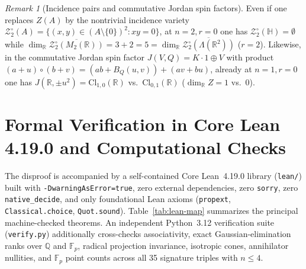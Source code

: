 \documentclass[11pt,a4paper]{article}
\theoremstyle{definition}
\theoremstyle{remark}
\newtheorem{remark}[theorem]{Remark}
\newcommand{\Cl}{\mathrm{Cl}}
\begin{document}
\begin{remark}[Incidence pairs and commutative Jordan spin factors]
Even if one replaces $Z(A)$ by the nontrivial incidence variety $\mathcal{Z}_2^\circ(A) = \{(x, y) \in (A \setminus \{0\})^2 : xy = 0\}$, at $n = 2, r = 0$ one has $\mathcal{Z}_2^\circ(\mathbb{H}) = \emptyset$ while $\dim_{\mathbb{R}} \overline{\mathcal{Z}_2^\circ(M_2(\mathbb{R}))} = 3 + 2 = 5 = \dim_{\mathbb{R}} \overline{\mathcal{Z}_2^\circ(\Lambda(\mathbb{R}^2))}$ ($r = 2$). Likewise, in the commutative Jordan spin factor $J(V, Q) = K\cdot 1 \oplus V$ with product $(a + u) \circ (b + v) = (ab + B_Q(u, v)) + (av + bu)$, already at $n = 1, r = 0$ one has $J(\mathbb{R}, \pm u^2) = \Cl_{1,0}(\mathbb{R})$ vs.\ $\Cl_{0,1}(\mathbb{R})$ ($\dim_{\mathbb{R}} Z = 1$ vs.\ $0$).
\end{remark}

\section{Formal Verification in Core Lean 4.19.0 and Computational Checks}

The disproof is accompanied by a self-contained Core Lean~4.19.0 library (\texttt{lean/}) built with \texttt{-DwarningAsError=true}, zero external dependencies, zero \texttt{sorry}, zero \texttt{native\_decide}, and only foundational Lean axioms (\texttt{propext}, \texttt{Classical.choice}, \texttt{Quot.sound}). Table~\ref{tab:lean-map} summarizes the principal machine-checked theorems. An independent Python~3.12 verification suite (\texttt{verify.py}) additionally cross-checks associativity, exact Gaussian-elimination ranks over $\mathbb{Q}$ and $\mathbb{F}_p$, radical projection invariance, isotropic cones, annihilator nullities, and $\mathbb{F}_p$ point counts across all 35 signature triples with $n \le 4$.
\end{document}
